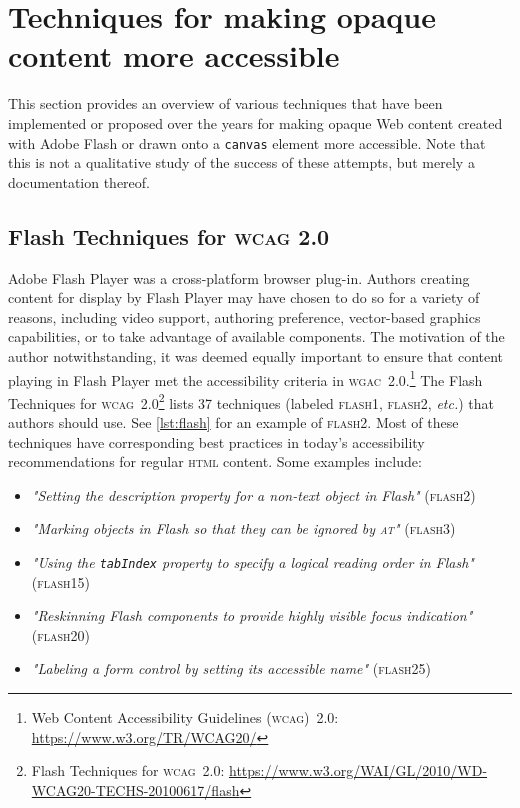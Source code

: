 \documentclass[sigconf]{acmart}
\begin{document}
\section{Techniques for making opaque content more accessible}

This section provides an overview of various techniques that have been implemented or proposed over the years for making opaque Web content created with Adobe Flash or drawn onto a \texttt{canvas} element more accessible. Note that this is not a qualitative study of the success of these attempts, but merely a documentation thereof.

\subsection{Flash Techniques for \textsc{wcag} 2.0}

Adobe Flash Player was a cross-platform browser plug-in. Authors creating content for display by Flash Player may have chosen to do so for a variety of reasons, including video support, authoring preference, vector-based graphics capabilities, or to take advantage of available components. The motivation of the author notwithstanding, it was deemed equally important to ensure that content playing in Flash Player met the accessibility criteria in \textsc{wgac}\ 2.0.\footnote{Web Content Accessibility Guidelines (\textsc{wcag})\ 2.0: \url{https://www.w3.org/TR/WCAG20/}} The Flash Techniques for \textsc{wcag}\ 2.0\footnote{Flash Techniques for \textsc{wcag}\ 2.0: \url{https://www.w3.org/WAI/GL/2010/WD-WCAG20-TECHS-20100617/flash}} lists 37 techniques (labeled \textsc{flash}1, \textsc{flash}2, \textit{etc.}) that authors should use. See \autoref{lst:flash} for an example of \textsc{flash}2. Most of these techniques have corresponding best practices in today's accessibility recommendations for regular \textsc{html} content. Some examples include:

\begin{itemize}
  \item \textit{"Setting the description property for a non-text object in Flash"} (\textsc{flash}2)
  \item \textit{"Marking objects in Flash so that they can be ignored by \textsc{at}"} (\textsc{flash}3)
  \item \textit{"Using the \texttt{tabIndex} property to specify a logical reading order in Flash"} (\textsc{flash}15)
  \item \textit{"Reskinning Flash components to provide highly visible focus indication"} (\textsc{flash}20)
  \item \textit{"Labeling a form control by setting its accessible name"} (\textsc{flash}25)
\end{itemize}
\end{document}
